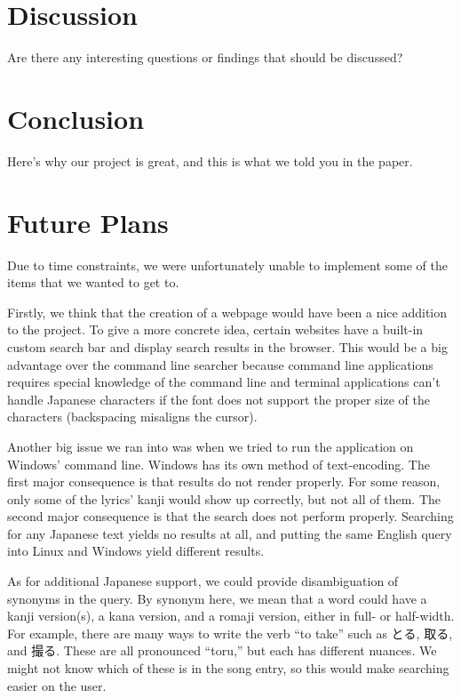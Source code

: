 \documentclass{acm} %
\begin{document}
\begin{CJK}{UTF8}{zhsong}
\section{Discussion}

Are there any interesting questions or findings that should be discussed?

\section{Conclusion}

Here's why our project is great, and this is what we told you in the paper.

\section{Future Plans}

Due to time constraints, we were unfortunately unable to implement some of the items that we wanted to get to.

Firstly, we think that the creation of a webpage would have been a nice addition to the project. To give a more concrete idea, certain websites have a built-in custom search bar and display search results in the browser. This would be a big advantage over the command line searcher because command line applications requires special knowledge of the command line and terminal applications can't handle Japanese characters if the font does not support the proper size of the characters (backspacing misaligns the cursor).

Another big issue we ran into was when we tried to run the application on Windows' command line. Windows has its own method of text-encoding. The first major consequence is that results do not render properly. For some reason, only some of the lyrics' kanji would show up correctly, but not all of them. The second major consequence is that the search does not perform properly. Searching for any Japanese text yields no results at all, and putting the same English query into Linux and Windows yield different results.

As for additional Japanese support, we could provide disambiguation of synonyms in the query. By synonym here, we mean that a word could have a kanji version(s), a kana version, and a romaji version, either in full- or half-width. For example, there are many ways to write the verb ``to take'' such as とる, 取る, and 撮る. These are all pronounced ``toru,'' but each has different nuances. We might not know which of these is in the song entry, so this would make searching easier on the user.


\end{CJK}
\end{document}
